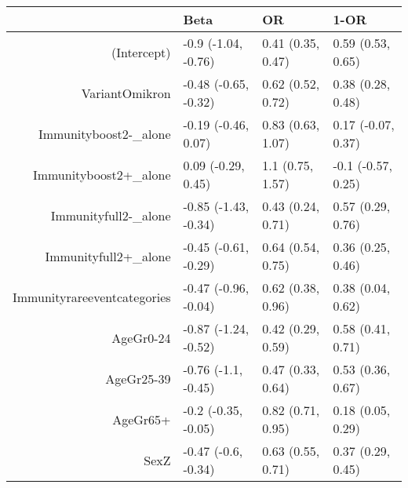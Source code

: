 \begin{table}[ht]
\centering
\begin{tabular}{rlll}
  \hline
 & Beta & OR & 1-OR \\ 
  \hline
(Intercept) & -0.9 (-1.04, -0.76) & 0.41 (0.35, 0.47) & 0.59 (0.53, 0.65) \\ 
  VariantOmikron & -0.48 (-0.65, -0.32) & 0.62 (0.52, 0.72) & 0.38 (0.28, 0.48) \\ 
  Immunityboost2-\_alone & -0.19 (-0.46, 0.07) & 0.83 (0.63, 1.07) & 0.17 (-0.07, 0.37) \\ 
  Immunityboost2+\_alone & 0.09 (-0.29, 0.45) & 1.1 (0.75, 1.57) & -0.1 (-0.57, 0.25) \\ 
  Immunityfull2-\_alone & -0.85 (-1.43, -0.34) & 0.43 (0.24, 0.71) & 0.57 (0.29, 0.76) \\ 
  Immunityfull2+\_alone & -0.45 (-0.61, -0.29) & 0.64 (0.54, 0.75) & 0.36 (0.25, 0.46) \\ 
  Immunityrareeventcategories & -0.47 (-0.96, -0.04) & 0.62 (0.38, 0.96) & 0.38 (0.04, 0.62) \\ 
  AgeGr0-24 & -0.87 (-1.24, -0.52) & 0.42 (0.29, 0.59) & 0.58 (0.41, 0.71) \\ 
  AgeGr25-39 & -0.76 (-1.1, -0.45) & 0.47 (0.33, 0.64) & 0.53 (0.36, 0.67) \\ 
  AgeGr65+ & -0.2 (-0.35, -0.05) & 0.82 (0.71, 0.95) & 0.18 (0.05, 0.29) \\ 
  SexZ & -0.47 (-0.6, -0.34) & 0.63 (0.55, 0.71) & 0.37 (0.29, 0.45) \\ 
   \hline
\end{tabular}
\end{table}
